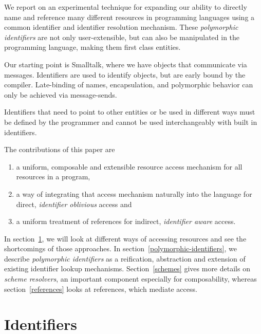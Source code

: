 \documentclass[preprint,authoryear]{acm_proc_article-sp}
\begin{document}
We report on an experimental
technique for expanding our ability to directly name and reference many different 
resources
in programming languages using a common identifier and identifier resolution
mechanism.
These \emph{polymorphic identifiers} are not only user-extensible,
but can also be manipulated in the programming language, making them first class 
entities.

Our starting point is Smalltalk, where we have objects
that communicate via messages\cite{Goldberg1983}.   Identifiers are used to identify 
objects, but are early bound by the compiler.  Late-binding of names, encapsulation,
and polymorphic behavior can only be achieved via message-sends.


Identifiers that need to point to other entities or be used in different ways must be defined
by the programmer and cannot be used interchangeably with built in identifiers.  

The contributions of this paper are
\begin{enumerate} \item a uniform, composable and extensible resource access mechanism for all
resources in a program, \item  a way of integrating that access mechanism naturally into the language for
direct, {\em identifier oblivious} access and
\item a uniform treatment of references for indirect, {\em identifier aware} access.
\end{enumerate}

In section~\ref{identifiers}, we will look at different ways of accessing resources and see
the shortcomings of those approaches.  In section~\ref{polymorphic-identifiers}, we 
describe {\em polymorphic identifiers} as a reification, abstraction and extension of existing 
identifier lookup mechanisms.  Section~\ref{schemes} gives more details on {\em scheme resolvers},
an important component especially for composability, whereas section~\ref{references} looks
at references, which mediate access.  








\section{Identifiers}
\label{identifiers}
\end{document}
